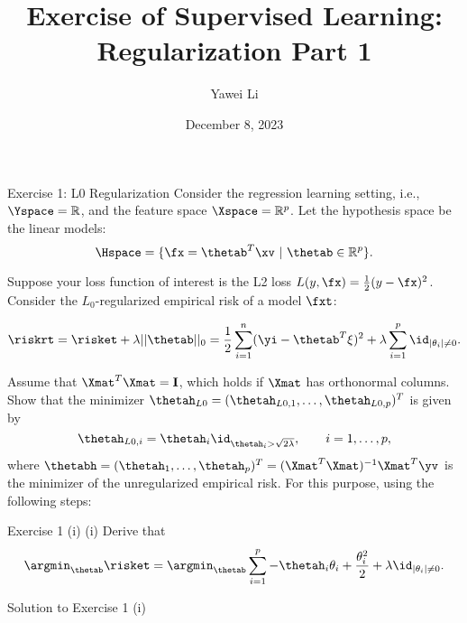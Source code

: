 \documentclass[aspectratio=169]{beamer}
\title[]{\textbf{Exercise of Supervised Learning: \\ Regularization Part 1}}
\author{Yawei Li}
\institute[LMU]
{
\\
  \texttt{yawei.li@stat.uni-muenchen.de}
}
\date{December 8, 2023}
\newcommand{\thetahi}{\thetah_i}
\newcommand{\thetai}{\theta_i}
\newcommand{\thetainnz}{\id_{|\theta_i| \neq 0}}
\newcommand{\Imat}{\mathbf{I}}
\newcommand{\sumip}{\sum_{i=1}^p}
\begin{document}
\begin{frame}
\titlepage

\end{frame}



\begin{frame}{Exercise 1: L0 Regularization}
	\small
	Consider the regression learning setting, i.e., $\Yspace = \mathbb{R}$, and the feature space $\Xspace = \mathbb{R}^p$. Let the hypothesis space be the linear models: $$\Hspace = \{ \fx = \thetab^T \xv \ | \ \thetab \in \mathbb{R}^p \}.$$
	
	Suppose your loss function of interest is the L2 loss $L(y, \fx) = \frac{1}{2} (y - \fx)^2$. Consider the $L_0$-regularized empirical risk of a model $\fxt$: 
	
	$$
		\riskrt = \risket + \lambda ||\thetab ||_0 = \frac{1}{2} \sum_{i=1}^n (\yi - \thetab^T \xi )^2 + \lambda \sum_{i=1}^p \thetainnz.
	$$
	
	Assume that $\Xmat^T \Xmat = \Imat$, which holds if $\Xmat$ has orthonormal columns. Show that the minimizer $\thetah_{L0} = (\thetah_{L0, 1}, \ldots, \thetah_{L0, p})^T$ is given by 
	$$
		\thetah_{L0, i} = \thetahi \id_{\thetahi > \sqrt{2 \lambda}}, \qquad i = 1, \ldots, p,
	$$
	where $\thetabh = (\thetah_1, \ldots, \thetah_p)^T = (\Xmat^T \Xmat)^{-1} \Xmat^T \yv$ is the minimizer of the unregularized empirical risk. For this purpose, using the following steps:
	
\end{frame}

\begin{frame}{Exercise 1 (i)}
	(i) Derive that 
	\begin{align*}
		\argmin_{\thetab} \risket = \argmin_{\thetab} \sumip - \thetahi \thetai + \frac{\thetai^2}{2} + \lambda \thetainnz.
	\end{align*}
\end{frame}

\begin{frame}{Solution to Exercise 1 (i)}
	
\end{frame}
\end{document}
